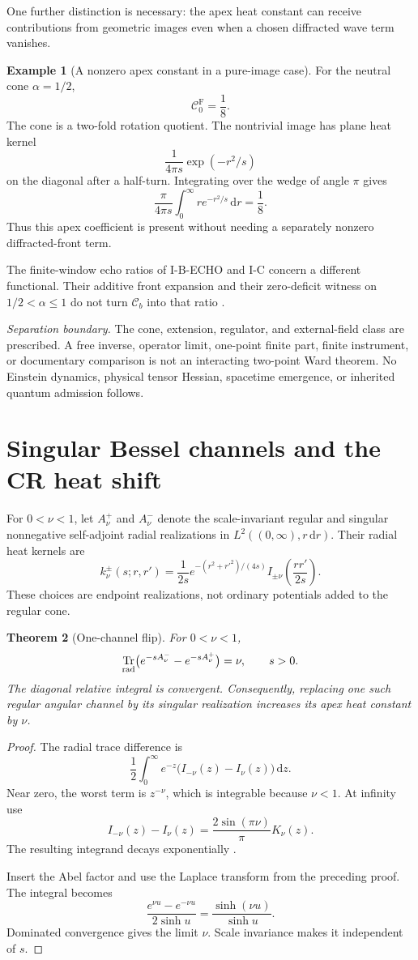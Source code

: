 \documentclass[11pt,a4paper]{article}
\newcommand{\dd}{\mathrm d}
\newcommand{\Fr}{\mathrm F}
\newcommand{\Ccb}{\mathcal C}
\DeclareMathOperator{\Tr}{Tr}
\theoremstyle{plain}
\newtheorem{theorem}{Theorem}[section]
\theoremstyle{definition}
\newtheorem{example}[theorem]{Example}
\theoremstyle{remark}
\numberwithin{equation}{section}
\newcommand{\separation}{%
\par\smallskip\noindent
\emph{Separation boundary.}
The cone, extension, regulator, and external-field class are prescribed.
A free inverse, operator limit, one-point finite part, finite instrument,
or documentary comparison is not an interacting two-point Ward theorem.
No Einstein dynamics, physical tensor Hessian, spacetime emergence,
or inherited quantum admission follows.
}
\begin{document}
One further distinction is necessary: the apex heat constant can
receive contributions from geometric images even when a chosen
diffracted wave term vanishes.

\begin{example}[A nonzero apex constant in a pure-image case]
\label{ex:image}
For the neutral cone \(\alpha=1/2\),
\[
\Ccb_0^\Fr=\frac18.
\]
The cone is a two-fold rotation quotient. The nontrivial image has
plane heat kernel
\[
\frac1{4\pi s}\exp(-r^2/s)
\]
on the diagonal after a half-turn.
Integrating over the wedge of angle \(\pi\) gives
\[
\frac{\pi}{4\pi s}
 \int_0^\infty r e^{-r^2/s}\,\dd r=\frac18.
\]
Thus this apex coefficient is present without needing a separately
nonzero diffracted-front term.
\end{example}

The finite-window echo ratios of I-B-ECHO and I-C concern a
different functional. Their additive front expansion and their
zero-deficit witness on \(1/2<\alpha\le1\) do not turn
\(\Ccb_b\) into that ratio
\cite{CheungEcho,CheungIC}.
\separation

\section{Singular Bessel channels and the CR heat shift}
\label{sec:flip}

For \(0<\nu<1\), let \(A_\nu^+\) and \(A_\nu^-\) denote the
scale-invariant regular and singular nonnegative self-adjoint radial
realizations in \(L^2((0,\infty),r\,\dd r)\).
Their radial heat kernels are
\[
k_\nu^\pm(s;r,r')
 =\frac1{2s}
  e^{-(r^2+r'^2)/(4s)}
  I_{\pm\nu}\!\left(\frac{rr'}{2s}\right).
\]
These choices are endpoint realizations, not ordinary potentials
added to the regular cone.

\begin{theorem}[One-channel flip]
\label{thm:flip}
For \(0<\nu<1\),
\begin{equation}
\Tr_{\rm rad}
 \bigl(e^{-sA_\nu^-}-e^{-sA_\nu^+}\bigr)=\nu,
\qquad s>0.
\label{eq:flip}
\end{equation}
The diagonal relative integral is convergent.
Consequently, replacing one such regular angular channel by its
singular realization increases its apex heat constant by \(\nu\).
\end{theorem}

\begin{proof}
The radial trace difference is
\[
\frac12\int_0^\infty
 e^{-z}\bigl(I_{-\nu}(z)-I_\nu(z)\bigr)\,\dd z.
\]
Near zero, the worst term is \(z^{-\nu}\), which is integrable
because \(\nu<1\).
At infinity use
\[
I_{-\nu}(z)-I_\nu(z)
 =\frac{2\sin(\pi\nu)}{\pi}K_\nu(z).
\]
The resulting integrand decays exponentially
\cite{DLMF}.

Insert the Abel factor and use the Laplace transform from the
preceding proof. The integral becomes
\[
\frac{e^{\nu u}-e^{-\nu u}}{2\sinh u}
 =\frac{\sinh(\nu u)}{\sinh u}.
\]
Dominated convergence gives the limit \(\nu\).
Scale invariance makes it independent of \(s\).
\end{proof}
\end{document}

